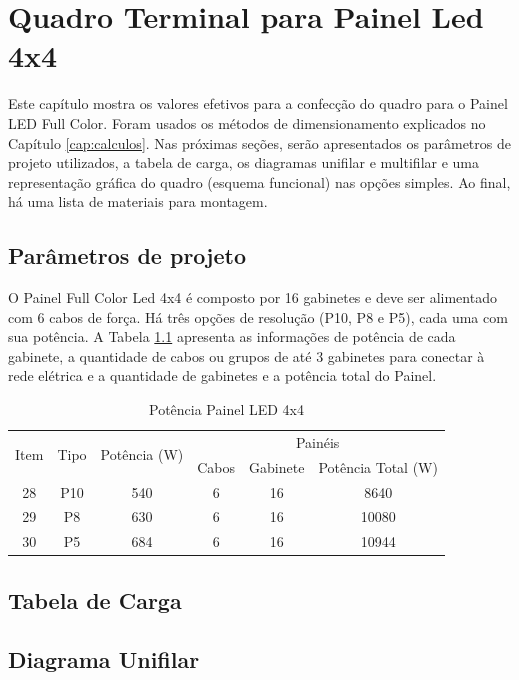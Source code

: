 \chapter{Quadro Terminal para Painel Led 4x4}

Este capítulo mostra os valores efetivos para a confecção do quadro para o Painel LED Full Color. Foram usados os métodos de dimensionamento explicados no Capítulo \ref{cap:calculos}. Nas próximas seções, serão apresentados os parâmetros de projeto utilizados, a tabela de carga, os diagramas unifilar e multifilar e uma representação gráfica do quadro (esquema funcional) nas opções simples. Ao final, há uma lista de materiais para montagem.

\section{Parâmetros de projeto}

O Painel Full Color Led 4x4 é composto por 16 gabinetes e deve ser alimentado com 6 cabos de força. Há três opções de resolução (P10, P8 e P5), cada uma com sua potência. A Tabela \ref{tab:pot_4x4} apresenta as informações de potência de cada gabinete, a quantidade de cabos ou grupos de até 3 gabinetes para conectar à rede elétrica e a quantidade de gabinetes e a potência total do Painel.

\begin{table}[htbp]
\caption{Potência Painel LED 4x4}
\centering
\begin{tabular}{cccccc}
\toprule
\multirow{2}{*}{Item} & \multirow{2}{*}{Tipo} & \multirow{2}{*}{Potência (W)} & \multicolumn{3}{c}{Painéis} \\
\cmidrule{4-6}
& & & Cabos  & Gabinete & Potência Total (W) \\
\midrule


28 & P10 & 540 & 6 & 16 & 8640 \\
29 & P8 & 630 & 6 & 16 & 10080 \\
30 & P5 & 684 & 6 & 16 & 10944 \\


\bottomrule
\end{tabular}
\label{tab:pot_4x4}
\end{table}



\section{Tabela de Carga}
\section{Diagrama Unifilar}


